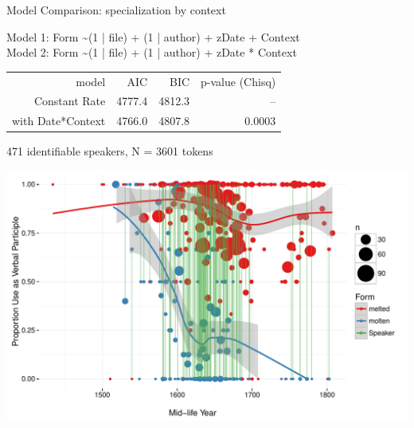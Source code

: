 \documentclass[hyperref={pdfpagelabels=false}]{beamer}
\begin{document}
\begin{frame}{Model Comparison: specialization by context}

\begin{center}
Model 1: Form \textasciitilde  (1 | file) + (1 | author) + zDate + Context\\
\vspace*{1mm}
Model 2: Form \textasciitilde  (1 | file) + (1 | author) + zDate{  }*{  }Context\\
\vspace*{4mm}

	\begin{tabular}{rrrr}
\toprule
	model & AIC & BIC & p-value (Chisq)\\
	\cmidrule{2-4}
Constant Rate & 4777.4 & 4812.3 & -- \\
with Date*Context &  4766.0 & 4807.8 & 0.0003\\
\bottomrule
\end{tabular}
\end{center}
\end{frame}



\begin{frame}{471 identifiable speakers, N = 3601 tokens}

\includegraphics[width=1.128\textwidth]{ContextByDateAuthor.pdf}
\end{frame}
\end{document}

